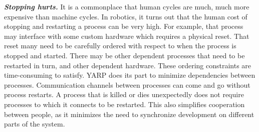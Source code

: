 \textit{\textbf{Stopping hurts.}}
It is a commonplace that human cycles are much, much more expensive
than machine cycles.  In robotics, it turns out that the human
cost of stopping and restarting a process can be very high.
For example, that process may interface with some
custom hardware which requires a physical reset.  
That reset many need to be carefully ordered with respect to when the
process is stopped and started.
%
There may be other dependent processes that need to be restarted in
turn, and other dependent hardware. 
%
%
%
These ordering constraints are time-consuming to satisfy.
%
YARP does its part to minimize dependencies between processes.
Communication channels between processes can come and go without
process restarts.
A process that is killed or dies
unexpectedly does not require processes to which it connects to be
restarted. This also simplifies cooperation between people, as
it minimizes the need to synchronize development on different  
parts of the system.
%
%

